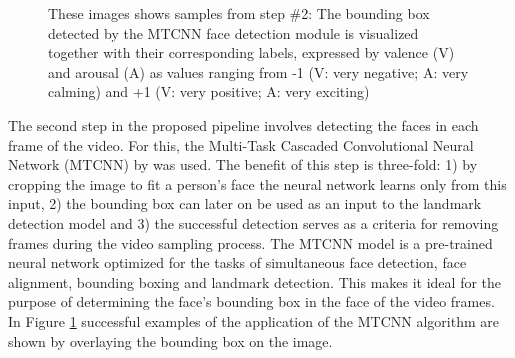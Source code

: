 \begin{figure}[H]
  \hfill
  \caption[ER pipeline step \#2: Face detection \& bounding box]{These images shows samples from step \#2: The bounding box detected by the MTCNN \citep{Zhang:2016:MTCCN} face detection module is visualized together with their corresponding labels, expressed by valence (V) and arousal (A) as values ranging from -1 (V: very negative; A: very calming) and +1 (V: very positive; A: very exciting)}
  \label{fig:MethodologyBoundingBox}
\end{figure}

The second step in the proposed pipeline involves detecting the faces in each frame of the video. For this, the Multi-Task Cascaded Convolutional Neural Network (MTCNN) by \citet{Zhang:2016:MTCCN} was used. The benefit of this step is three-fold: 1) by cropping the image to fit a person's face the neural network learns only from this input, 2) the bounding box can later on be used as an input to the landmark detection model and 3) the successful detection serves as a criteria for removing frames during the video sampling process.
\newline\newline
The MTCNN \citep{Zhang:2016:MTCCN} model is a pre-trained neural network optimized for the tasks of simultaneous face detection, face alignment, bounding boxing and landmark detection. This makes it ideal for the purpose of determining the face's bounding box in the face of the video frames. In Figure \ref{fig:MethodologyBoundingBox} successful examples of the application of the MTCNN algorithm are shown by overlaying the bounding box on the image.



